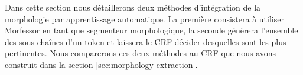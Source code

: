 \documentclass[PhD-Yoann-Dupont.tex]{subfiles}
\begin{document}
Dans cette section nous détaillerons deux méthodes d'intégration de la morphologie par apprentissage automatique. La première consistera à utiliser Morfessor en tant que segmenteur morphologique, la seconde génèrera l'ensemble des sous-chaînes d'un token et laissera le CRF décider desquelles sont les plus pertinentes. Nous comparerons ces deux méthodes au CRF que nous avons construit dans la section \ref{sec:morphology-extraction}.
\end{document}
